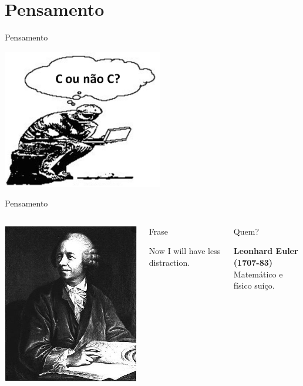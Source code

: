 \documentclass[xcolor=dvipsnames,table]{beamer}
\begin{document}
	\section{Pensamento}
	\begin{frame}{Pensamento}
  		\begin{center}
    		\includegraphics[width=7cm]{images/pensamento.png}
  		\end{center}
	\end{frame}
	
	\begin{frame}{Pensamento}
		\begin{columns}
		  		\begin{center}
		    		\includegraphics[height=.5\textheight]{images/euler.png}
		  		\end{center}
				\begin{block}{Frase}
					\begin{center}
						{\large Now I will have less distraction.}
					\end{center}
				\end{block}		  		
		  		\begin{block}{Quem?}
		  			\begin{center}
						{\bf Leonhard Euler (1707-83)} \\ Matemático e físico suíço.
					\end{center}
				\end{block}
		\end{columns}
	\end{frame}
\end{document}
